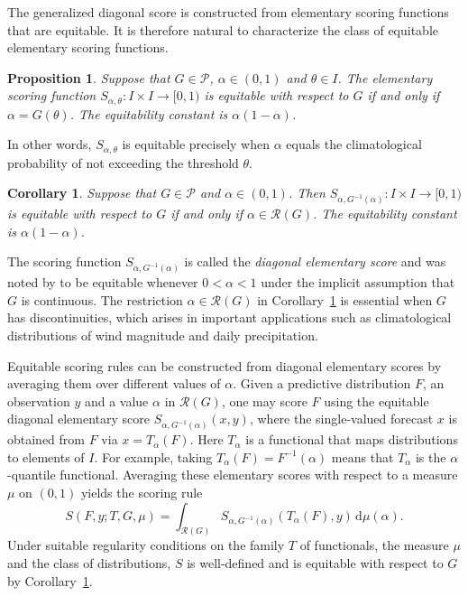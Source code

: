 \documentclass[10pt]{article} %
\theoremstyle{theorem}
\newtheorem{prop}{Proposition}
\newtheorem{cor}{Corollary}
\theoremstyle{definition}
\newcommand{\dd}{\mathrm{d}}
\newcommand{\RG}{\mathcal{R}(G)}
\begin{document}
The generalized diagonal score is constructed from elementary scoring functions that are equitable. It is therefore natural to characterize the class of equitable elementary scoring functions.

\begin{prop}\label{prop:elementary score equitable}
Suppose that $G\in\mathcal{P}$, $\alpha\in(0,1)$ and $\theta\in I$. The elementary scoring function $S_{\alpha,\theta}:I\times I\to[0,1)$ is equitable with respect to $G$ if and only if $\alpha=G(\theta)$. The equitability constant is $\alpha(1-\alpha)$.
\end{prop}

In other words, $S_{\alpha,\theta}$ is equitable precisely when $\alpha$ equals the climatological probability of not exceeding the threshold $\theta$.

\begin{cor}\label{cor:diagonal score equitable}
Suppose that $G\in\mathcal{P}$ and $\alpha\in(0,1)$. Then  $S_{\alpha,G^{-1}(\alpha)}:I\times I\to[0,1)$ is equitable with respect to $G$ if and only if $\alpha\in\RG$. The equitability constant is $\alpha(1-\alpha)$.
\end{cor}

The scoring function $S_{\alpha,G^{-1}(\alpha)}$ is called the \textit{diagonal elementary score} and was noted by \citet{ben2018diagonal} to be equitable whenever $0<\alpha<1$ under the implicit assumption that $G$ is continuous. The restriction $\alpha \in \RG$ in Corollary~\ref{cor:diagonal score equitable} is essential when $G$ has discontinuities, which arises in important applications such as climatological distributions of wind magnitude and daily precipitation.

Equitable scoring rules can be constructed from diagonal elementary scores by averaging them over different values of $\alpha$. Given a predictive distribution $F$, an observation $y$ and a value $\alpha$ in $\RG$, one may score $F$ using the equitable diagonal elementary score $S_{\alpha,G^{-1}(\alpha)}(x,y)$, where the single-valued forecast $x$ is obtained from $F$ via $x=T_\alpha(F)$. Here $T_\alpha$ is a functional that maps distributions to elements of $I$. For example, taking $T_\alpha(F)=F^{-1}(\alpha)$ means that $T_\alpha$ is the $\alpha$-quantile functional. Averaging these elementary scores with respect to a measure $\mu$ on $(0,1)$ yields the scoring rule
\begin{equation}\label{eq:general equitable scoring rule}
S(F,y; T, G, \mu) = \int_{\RG} S_{\alpha,G^{-1}(\alpha)}(T_\alpha(F), y) \,\dd\mu(\alpha).
\end{equation}
Under suitable regularity conditions on the family $T$ of functionals, the measure $\mu$ and the class of distributions, $S$ is well-defined and is equitable with respect to $G$ by Corollary~\ref{cor:diagonal score equitable}.
\end{document}
